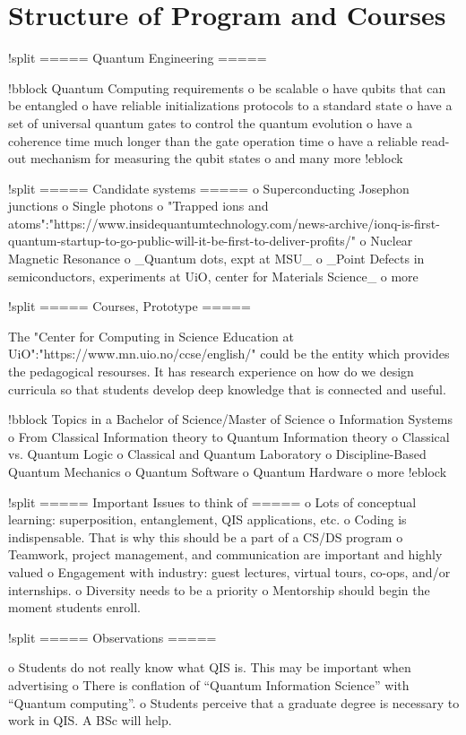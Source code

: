 \documentclass[oneside,final,10pt]{article}
\begin{document}
\section{Structure of Program and Courses}

!split
===== Quantum Engineering =====

!bblock Quantum Computing requirements
o be scalable
o have qubits that can be entangled
o have reliable initializations protocols to a standard state
o have a set of universal quantum gates to control the quantum evolution
o have a coherence time much longer than the gate operation time
o have a reliable read-out mechanism for measuring the qubit states
o and many more 
!eblock

!split
===== Candidate systems =====
o Superconducting Josephon junctions
o Single photons
o "Trapped ions and atoms":"https://www.insidequantumtechnology.com/news-archive/ionq-is-first-quantum-startup-to-go-public-will-it-be-first-to-deliver-profits/"
o Nuclear Magnetic Resonance
o _Quantum dots, expt at MSU_
o _Point Defects in semiconductors, experiments at UiO, center for Materials Science_
o more


!split
===== Courses, Prototype =====

The "Center for Computing in Science Education at UiO":"https://www.mn.uio.no/ccse/english/" could be the entity which provides the pedagogical resourses. It has research experience
on how do we design curricula so that students develop deep knowledge that is connected and useful.

!bblock Topics  in a Bachelor of Science/Master of Science
o Information Systems 
o From Classical Information theory to Quantum Information theory
o Classical vs. Quantum Logic
o Classical and Quantum Laboratory 
o Discipline-Based Quantum Mechanics 
o Quantum Software
o Quantum Hardware
o more
!eblock

!split
===== Important Issues to think of =====
o Lots of conceptual learning: superposition, entanglement, QIS applications, etc.
o Coding is indispensable. That is why this should be a part of a CS/DS program
o Teamwork, project management, and communication are important and highly valued
o Engagement with industry: guest lectures, virtual tours, co-ops, and/or internships.
o Diversity needs to be a priority
o Mentorship should begin the moment students enroll.

!split
===== Observations =====

o Students do not really know what QIS is. This may be important when advertising
o There is conflation of “Quantum Information Science” with “Quantum computing”.
o Students perceive that a graduate degree is necessary to work in QIS. A BSc will help.
\end{document}
